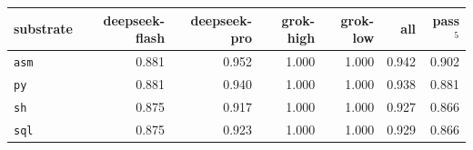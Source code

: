 \begin{tabular}{lrrrrrr}
\toprule
substrate & deepseek-flash & deepseek-pro & grok-high & grok-low & all & pass$^5$ \\
\midrule
\texttt{asm} & 0.881 & 0.952 & 1.000 & 1.000 & 0.942 & 0.902 \\
\texttt{py} & 0.881 & 0.940 & 1.000 & 1.000 & 0.938 & 0.881 \\
\texttt{sh} & 0.875 & 0.917 & 1.000 & 1.000 & 0.927 & 0.866 \\
\texttt{sql} & 0.875 & 0.923 & 1.000 & 1.000 & 0.929 & 0.866 \\
\bottomrule
\end{tabular}
